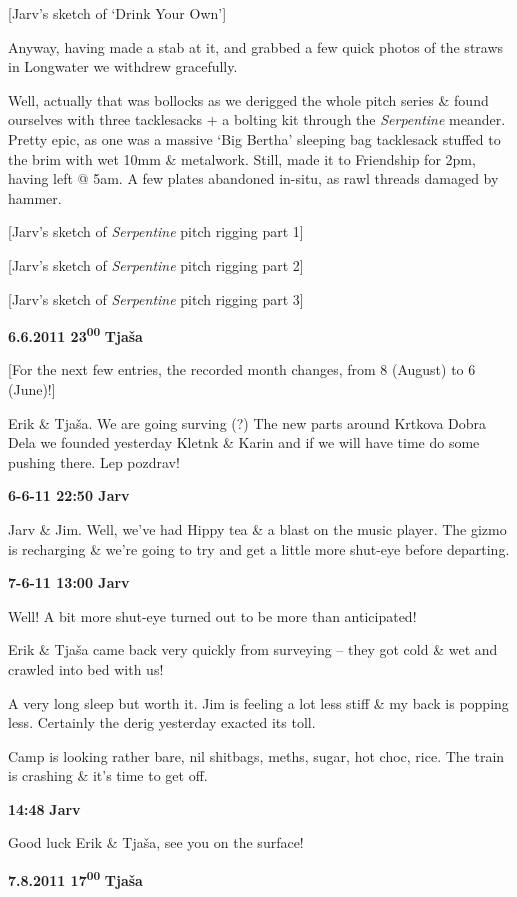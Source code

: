 {[}Jarv's sketch of `Drink Your Own'{]}

Anyway, having made a stab at it, and grabbed a few quick photos of the
straws in Longwater we withdrew gracefully.

Well, actually that was bollocks as we derigged the whole pitch series
\& found ourselves with three tacklesacks + a bolting kit through the
\emph{Serpentine} meander. Pretty epic, as one was a massive `Big
Bertha' sleeping bag tacklesack stuffed to the brim with wet 10mm \&
metalwork. Still, made it to Friendship for 2pm, having left @ 5am. A
few plates abandoned in-situ, as rawl threads damaged by hammer.

{[}Jarv's sketch of \emph{Serpentine} pitch rigging part 1{]}

{[}Jarv's sketch of \emph{Serpentine} pitch rigging part 2{]}

{[}Jarv's sketch of \emph{Serpentine} pitch rigging part 3{]}

\textbf{6.6.2011 23\textsuperscript{00}} \textbf{Tjaša}

{[}For the next few entries, the recorded month changes, from 8 (August)
to 6 (June)!{]}

Erik \& Tjaša. We are going surving (?) The new parts around Krtkova
Dobra Dela we founded yesterday Kletnk \& Karin and if we will have time
do some pushing there. Lep pozdrav!

\textbf{6-6-11 22:50 Jarv}

Jarv \& Jim. Well, we've had Hippy tea \& a blast on the music player.
The gizmo is recharging \& we're going to try and get a little more
shut-eye before departing.

\textbf{7-6-11 13:00 Jarv}

Well! A bit more shut-eye turned out to be more than anticipated!

Erik \& Tjaša came back very quickly from surveying -- they got cold \&
wet and crawled into bed with us!

A very long sleep but worth it. Jim is feeling a lot less stiff \& my
back is popping less. Certainly the derig yesterday exacted its toll.

Camp is looking rather bare, nil shitbags, meths, sugar, hot choc, rice.
The train is crashing \& it's time to get off.

\textbf{14:48} \textbf{Jarv}

Good luck Erik \& Tjaša, see you on the surface!

\textbf{7.8.2011 17\textsuperscript{00}} \textbf{Tjaša}

